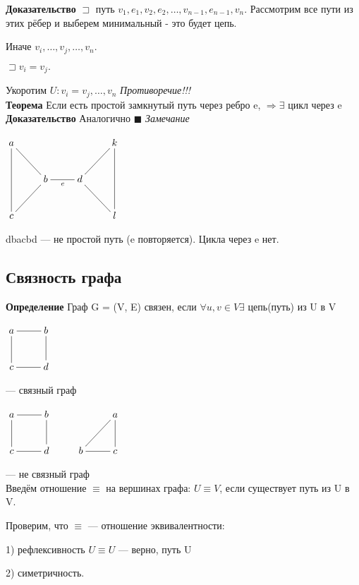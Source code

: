 \documentclass[a4paper, 12pt] {article}
\begin{document}
\textbf{Доказательство}
$\sqsupset \text{ путь } v_{1}, e_{1}, v_{2}, e_{2}, \dots, v_{n-1}, e_{n-1}, v_{n}$. Рассмотрим все пути из этих рёбер и выберем минимальный - это будет цепь.

Иначе $v_{i}, \dots, v_{j},  \dots, v_{n}.$ 

$\sqsupset v_{i} = v_{j}.$ 

$\text{Укоротим } U: v_{i} = v_{j}, \dots, v_{n}$ \textit{Противоречие!!!}\\

\textbf{Теорема}
Если есть простой замкнутый путь через ребро e, $\Rightarrow \exists$ цикл через e \\

\textbf{Доказательство}
Аналогично $\blacksquare$
\newpage
\textit{Замечание}

$\xymatrix{
	a \ar@{-}[dd] \ar@{-}[rd] & & & k \\
	& b \ar@{-}[r]_e \ar@{-}[dl] & d \ar@{-}[dr] \ar@{-}[ru] \\
	c & & & l \ar@{-}[uu] \\
}$

dbacbd --- не простой путь (e повторяется). Цикла через e нет.

\subsection{Связность графа}

\textbf{Определение}
Граф G = (V, E) связен, если $\forall u, v \in V \exists$ цепь(путь) из U в V

$\xymatrix{
	a \ar@{-}[d] \ar@{-}[r] & b \ar@{-}[d] \\
	c  \ar@{-}[r] & d \\
}$

--- связный граф

$\xymatrix{
	a \ar@{-}[d] \ar@{-}[r] & b \ar@{-}[d]  & & a \ar@{-}[d] \ar@{-}[dl]\\
	c  \ar@{-}[r] & d & b \ar@{-}[r] & c\\
}$

--- не связный граф\\

Введём отношение $\equiv$ на вершинах графа: $U \equiv V$, если существует путь из U в V.

Проверим, что $\equiv$ --- отношение эквивалентности:

1) рефлексивность $U \equiv U$ --- верно, путь U

2) симетричность.
\end{document}
